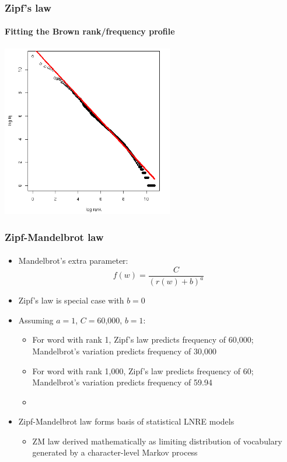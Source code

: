\documentclass[handout,notes=show,t]{beamer} %
\begin{document}
\begin{frame}
  \frametitle{Zipf's law}
  \framesubtitle{Fitting the Brown rank/frequency profile}

  \begin{center}
    \includegraphics[height=7.5cm]{img/brown-zipf-rf}
  \end{center}
\end{frame}

\begin{frame}
  \frametitle{Zipf-Mandelbrot law}
  \framesubtitle{\citet{Mandelbrot:53,Mandelbrot:62}}

  \begin{itemize}
    \item Mandelbrot's extra parameter:
    \[
    f(w)=\frac{C}{(r(w) + b)^a}
    \]
  \item Zipf's law is special case with $b=0$
  \item Assuming $a=1$, $C=$60,000, $b=1$:
    \begin{itemize}
    \item For word with rank 1, Zipf's law predicts frequency of
      60,000; Mandelbrot's variation predicts frequency of 30,000
    \item For word with rank 1,000,  Zipf's law predicts frequency of
      60; Mandelbrot's variation predicts frequency of 59.94
    \item[]
    \end{itemize}
  \item Zipf-Mandelbrot law forms basis of statistical LNRE models%
    \begin{itemize}
    \item ZM law derived mathematically as limiting distribution of
      vocabulary generated by a character-level Markov process
    \end{itemize}
  \end{itemize}
\end{frame}
\end{document}

